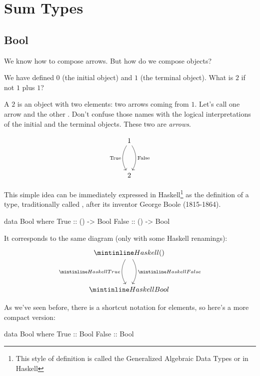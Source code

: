 \documentclass[DaoFP]{subfiles}
\begin{document}
\setcounter{chapter}{3}

\chapter{Sum Types}

\section{Bool}

We know how to compose arrows. But how do we compose objects?

 We have defined $0$ (the initial object) and $1$ (the terminal object). What is $2$ if not $1$ plus $1$?
 
A $2$ is an object with two elements: two arrows coming from $1$. Let's call one arrow  and the other . Don't confuse those names with the logical interpretations of the initial and the terminal objects. These two are \emph{arrows}. 

\[
 \begin{tikzcd}
 1
 \arrow[dd, bend right, "\text{True}"']
 \arrow[dd, bend left, "\text{False}"]
 \\
 \\
2
 \end{tikzcd}
\]

This simple idea can be immediately expressed in Haskell\footnote{This style of definition is called the Generalized Algebraic Data Types or  in Haskell} as the definition of a type, traditionally called , after its inventor George Boole (1815-1864).

\begin{haskell}
data Bool where
  True  :: () -> Bool
  False :: () -> Bool
\end{haskell}
It corresponds to the same diagram (only with some Haskell renamings):
\[
 \begin{tikzcd}
 \hask{()}
 \arrow[dd, bend right, "\hask{True}"']
 \arrow[dd, bend left, "\hask{False}"]
 \\
 \\
\hask{Bool}
 \end{tikzcd}
\]

As we've seen before, there is a shortcut notation for elements, so here's a more compact version:

\begin{haskell}
data Bool where
  True  :: Bool
  False :: Bool
\end{haskell}
\end{document}
